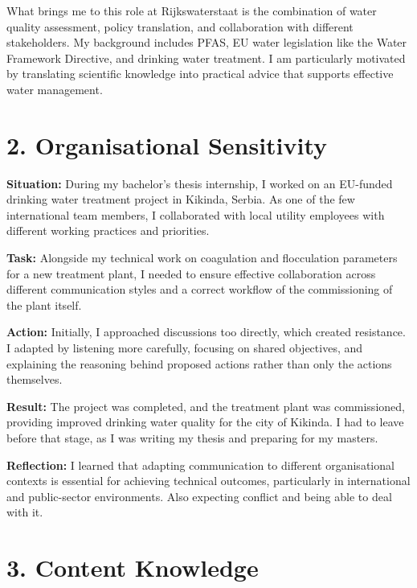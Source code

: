 \documentclass[11pt]{report}
\begin{document}
\begin{titlepage}
What brings me to this role at Rijkswaterstaat is the combination of water quality assessment, policy translation, and collaboration with different stakeholders. My background includes PFAS, EU water legislation like the Water Framework Directive, 
and drinking water treatment. I am particularly motivated by translating scientific knowledge into practical advice that supports effective water management.

\vspace{1em}

\section*{2. Organisational Sensitivity}

\textbf{Situation:} During my bachelor's thesis internship, I worked on an EU-funded drinking water treatment project in Kikinda, Serbia. As one of the few international team members, I collaborated with local utility employees with different working practices and priorities.

\textbf{Task:} Alongside my technical work on coagulation and flocculation parameters for a new treatment plant, I needed to ensure effective collaboration across different communication styles and a correct workflow of the commissioning of the plant itself.

\textbf{Action:} Initially, I approached discussions too directly, which created resistance. I adapted by listening more carefully, focusing on shared objectives, and explaining the reasoning behind proposed actions rather than only the actions themselves.

\textbf{Result:} The project was completed, and the treatment plant was commissioned, providing improved drinking water quality for the city of Kikinda. I had to leave before that stage, as I was writing my thesis and preparing for my masters.

\textbf{Reflection:} I learned that adapting communication to different organisational contexts is essential for achieving technical outcomes, particularly in international and public-sector environments. Also expecting conflict and being able to deal with it. 

\vspace{1em}

\section*{3. Content Knowledge}


\end{titlepage}
\end{document}
